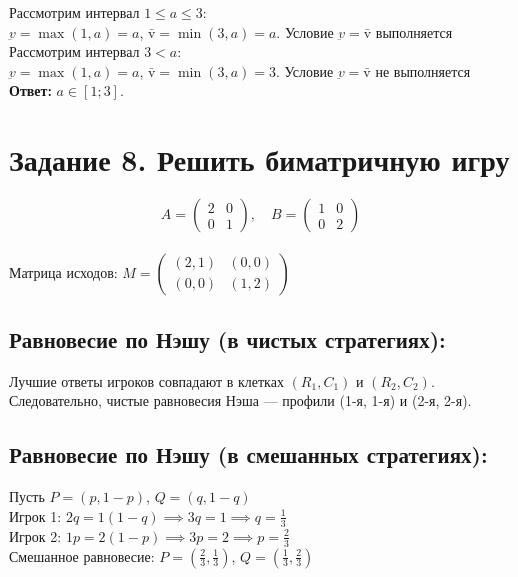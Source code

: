 \documentclass[a4paper,12pt]{article}
\begin{document}
Рассмотрим интервал $1 \le a \le 3$: \\
$\underbar{v} = \max(1, a) = a$, $\bar{\text{v}} = \min(3, a) = a$. Условие $\underbar{v} = \bar{\text{v}}$ выполняется \\

Рассмотрим интервал $3 < a$: \\
$\underbar{v} = \max(1, a) = a$, $\bar{\text{v}} = \min(3, a) = 3$. Условие $\underbar{v} = \bar{\text{v}}$ не выполняется \\

\textbf{Ответ:} $a \in [1; 3]$.


\newpage


\section*{Задание 8. Решить биматричную игру}
$$A = \begin{pmatrix} 2 & 0 \\ 0 & 1 \end{pmatrix}, \quad B = \begin{pmatrix} 1 & 0 \\ 0 & 2 \end{pmatrix}$$ \\

Матрица исходов: $M = \begin{pmatrix} (2, 1) & (0, 0) \\ (0, 0) & (1, 2) \end{pmatrix}$ \\

\subsection*{Равновесие по Нэшу (в чистых стратегиях):}
Лучшие ответы игроков совпадают в клетках $(R_1, C_1)$ и $(R_2, C_2)$.
Следовательно, чистые равновесия Нэша — профили (1-я, 1-я) и (2-я, 2-я).

\subsection*{Равновесие по Нэшу (в смешанных стратегиях):}
Пусть $P=(p, 1-p)$, $Q=(q, 1-q)$ \\
Игрок 1: $2q = 1(1-q) \implies 3q = 1 \implies q = \frac{1}{3}$ \\
Игрок 2: $1p = 2(1-p) \implies 3p = 2 \implies p = \frac{2}{3}$ \\
Смешанное равновесие: $P = (\frac{2}{3}, \frac{1}{3})$, $Q = (\frac{1}{3}, \frac{2}{3})$
\end{document}
